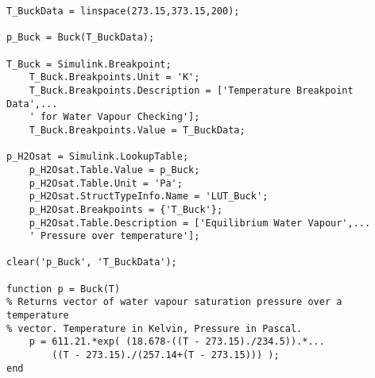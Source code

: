 \begin{lstlisting}[caption={[Water saturation vapour pressure over temperature]Water saturation vapour pressure over temperature, \iecfeg{cf.}\ \cref{ch:humid_air}},label={matlab:buck}]
T_BuckData = linspace(273.15,373.15,200);

p_Buck = Buck(T_BuckData);

T_Buck = Simulink.Breakpoint;
	T_Buck.Breakpoints.Unit = 'K';
	T_Buck.Breakpoints.Description = ['Temperature Breakpoint Data',...
	' for Water Vapour Checking'];
	T_Buck.Breakpoints.Value = T_BuckData;

p_H2Osat = Simulink.LookupTable;
	p_H2Osat.Table.Value = p_Buck;
	p_H2Osat.Table.Unit = 'Pa';
	p_H2Osat.StructTypeInfo.Name = 'LUT_Buck';
	p_H2Osat.Breakpoints = {'T_Buck'};
	p_H2Osat.Table.Description = ['Equilibrium Water Vapour',...
	' Pressure over temperature'];

clear('p_Buck', 'T_BuckData');

function p = Buck(T)
% Returns vector of water vapour saturation pressure over a temperature
% vector. Temperature in Kelvin, Pressure in Pascal.
	p = 611.21.*exp( (18.678-((T - 273.15)./234.5)).*...
		((T - 273.15)./(257.14+(T - 273.15))) );
end
\end{lstlisting}

